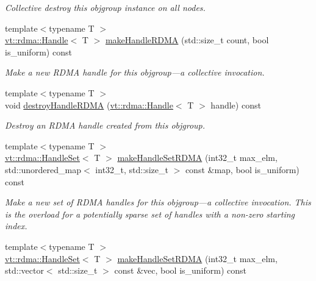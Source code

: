 \begin{DoxyCompactItemize}
\begin{DoxyCompactList}\small\item\em Collective destroy this objgroup instance on all nodes. \end{DoxyCompactList}\item 
{\footnotesize template$<$typename T $>$ }\\\hyperlink{structvt_1_1rdma_1_1_handle}{vt\+::rdma\+::\+Handle}$<$ T $>$ \hyperlink{structvt_1_1objgroup_1_1proxy_1_1_proxy_a205119186cc6b5a37d91df8eaac0500f}{make\+Handle\+R\+D\+MA} (std\+::size\+\_\+t count, bool is\+\_\+uniform) const
\begin{DoxyCompactList}\small\item\em Make a new R\+D\+MA handle for this objgroup---a collective invocation. \end{DoxyCompactList}\item 
{\footnotesize template$<$typename T $>$ }\\void \hyperlink{structvt_1_1objgroup_1_1proxy_1_1_proxy_a7510598b2915dec55b90bf9ae61c7df9}{destroy\+Handle\+R\+D\+MA} (\hyperlink{structvt_1_1rdma_1_1_handle}{vt\+::rdma\+::\+Handle}$<$ T $>$ handle) const
\begin{DoxyCompactList}\small\item\em Destroy an R\+D\+MA handle created from this objgroup. \end{DoxyCompactList}\item 
{\footnotesize template$<$typename T $>$ }\\\hyperlink{structvt_1_1rdma_1_1_handle_set}{vt\+::rdma\+::\+Handle\+Set}$<$ T $>$ \hyperlink{structvt_1_1objgroup_1_1proxy_1_1_proxy_a087ce0f4b9d0e6c38a8e5961747ae55c}{make\+Handle\+Set\+R\+D\+MA} (int32\+\_\+t max\+\_\+elm, std\+::unordered\+\_\+map$<$ int32\+\_\+t, std\+::size\+\_\+t $>$ const \&map, bool is\+\_\+uniform) const
\begin{DoxyCompactList}\small\item\em Make a new set of R\+D\+MA handles for this objgroup---a collective invocation. This is the overload for a potentially sparse set of handles with a non-\/zero starting index. \end{DoxyCompactList}\item 
{\footnotesize template$<$typename T $>$ }\\\hyperlink{structvt_1_1rdma_1_1_handle_set}{vt\+::rdma\+::\+Handle\+Set}$<$ T $>$ \hyperlink{structvt_1_1objgroup_1_1proxy_1_1_proxy_a297686853a318255a860cf7b2d63675c}{make\+Handle\+Set\+R\+D\+MA} (int32\+\_\+t max\+\_\+elm, std\+::vector$<$ std\+::size\+\_\+t $>$ const \&vec, bool is\+\_\+uniform) const

\end{DoxyCompactItemize}
